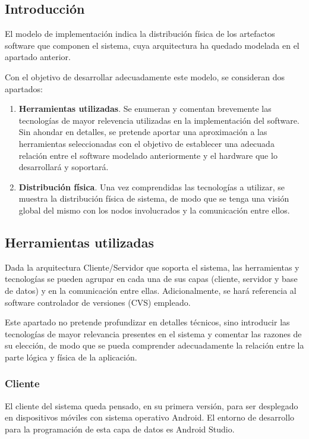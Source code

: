 \subsection{Introducción}

El modelo de implementación indica la distribución física de los artefactos software que componen el sistema, cuya arquitectura ha quedado modelada en el apartado anterior.

Con el objetivo de desarrollar adecuadamente este modelo, se consideran dos apartados:

\begin{enumerate}
	\item{\textbf{Herramientas utilizadas}. Se enumeran y comentan brevemente las tecnologías de mayor relevencia utilizadas en la implementación del software. Sin ahondar en detalles, se pretende aportar una aproximación a las herramientas seleccionadas con el objetivo de establecer una adecuada relación entre el software modelado anteriormente y el hardware que lo desarrollará y soportará}.
	\item{\textbf{Distribución física}. Una vez comprendidas las tecnologías a utilizar, se muestra la distribución física de sistema, de modo que se tenga una visión global del mismo con los nodos involucrados y la comunicación entre ellos}.
\end{enumerate}

\subsection{Herramientas utilizadas}
\label{subsec:herramientasImp}

Dada la arquitectura Cliente/Servidor que soporta el sistema, las herramientas y tecnologías se pueden agrupar en cada una de sus capas (cliente, servidor y base de datos) y en la comunicación entre ellas. Adicionalmente, se hará referencia al software controlador de versiones (CVS) empleado.

Este apartado no pretende profundizar en detalles técnicos, sino introducir las tecnologías de mayor relevancia presentes en el sistema y comentar las razones de su elección, de modo que se pueda comprender adecuadamente la relación entre la parte lógica y física de la aplicación.

\subsubsection{Cliente}

El cliente del sistema queda pensado, en su primera versión, para ser desplegado en dispositivos móviles con sistema operativo Android. El entorno de desarrollo para la programación de esta capa de datos es Android Studio.

